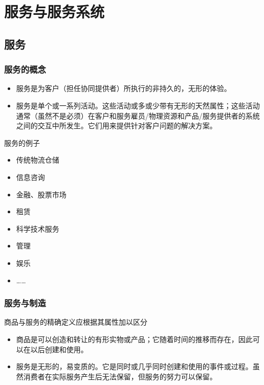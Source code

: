 \section{服务与服务系统}

\subsection{服务}

\subsubsection{服务的概念}

\begin{itemize}
    \item 服务是为客户（担任协同提供者）所执行的非持久的，无形的体验。
    \item 服务是单个或一系列活动。这些活动或多或少带有无形的天然属性；这些活动通常（虽然不是必须）在客户和服务雇员/物理资源和产品/服务提供者的系统之间的交互中所发生。它们用来提供针对客户问题的解决方案。
\end{itemize}

服务的例子
\vspace{-0.8em}
\begin{multicols}{4}
    \begin{itemize}
        \item 传统物流仓储
        \item 信息咨询
        \item 金融、股票市场
        \item 租赁
        \item 科学技术服务
        \item 管理
        \item 娱乐
        \item ……  
    \end{itemize}
\end{multicols}
\vspace{-1em}

\subsubsection{服务与制造}

商品与服务的精确定义应根据其属性加以区分
\begin{itemize}
    \item 商品是可以创造和转让的有形实物或产品；它随着时间的推移而存在，因此可以在以后创建和使用。
    \item 服务是无形的，易变质的。它是同时或几乎同时创建和使用的事件或过程。虽然消费者在实际服务产生后无法保留，但服务的努力可以保留。
\end{itemize}

